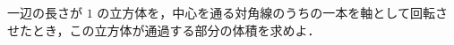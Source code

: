 \documentclass[../../main.tex]{subfiles}
\begin{document}
一辺の長さが $1$ の立方体を，中心を通る対角線のうちの一本を軸として回転させたとき，この立方体が通過する部分の体積を求めよ．
\end{document}
